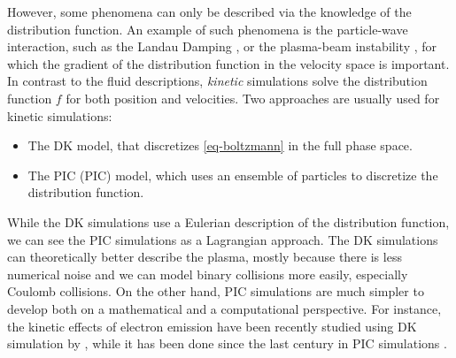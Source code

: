 \vspace{1em}
However, some phenomena can only be described via the knowledge of the distribution function.
An example of such phenomena is the particle-wave interaction, such as the Landau Damping \citep{landau1945,malmberg1964}, or the plasma-beam instability \citep{filippychev1990}, for which the gradient of the distribution function in the velocity space is important.
In contrast to the fluid descriptions, \emph{kinetic} simulations solve the distribution function $f$ for both position and velocities.
Two approaches are usually used for kinetic simulations\string:
\begin{itemize}
  \item The \ac{DK} model, that discretizes \cref{eq-boltzmann} in the full phase space.
  \item The \acl{PIC} (\acs{PIC}) model, which uses an ensemble of particles to discretize the distribution function.
\end{itemize} 
While the \ac{DK} simulations use a Eulerian description of the distribution function, we can see the \ac{PIC} simulations as a Lagrangian approach.
The \ac{DK} simulations can theoretically better describe the plasma, mostly because there is less numerical noise and we can model binary collisions more easily, especially Coulomb collisions.
On the other hand, \ac{PIC} simulations are much simpler to develop both on a mathematical and a computational perspective.
For instance, the kinetic effects of electron emission have been recently studied using \ac{DK} simulation by \citet{cagas2019}, while it has been done since the last century in \ac{PIC} simulations \citep{boswell1988}.


